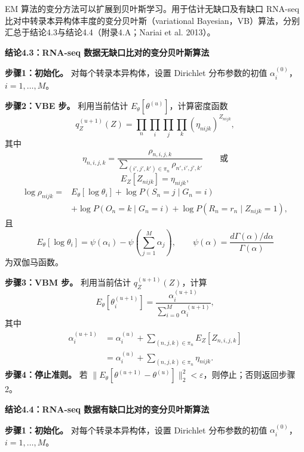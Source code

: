 EM 算法的变分方法可以扩展到贝叶斯学习。用于估计无缺口及有缺口 RNA-seq 比对中转录本异构体丰度的变分贝叶斯（variational Bayesian，VB）算法，分别汇总于结论4.3与结论4.4（附录4.A；Nariai et al. 2013）。

\par\medskip{}
\noindent\textbf{结论4.3：RNA-seq 数据无缺口比对的变分贝叶斯算法}\par
\noindent\textbf{步骤1：初始化。}
对每个转录本异构体，设置 Dirichlet 分布参数的初值 $\alpha_i^{(0)}$，$i=1,\ldots,M$。

\noindent\textbf{步骤2：VBE 步。}
利用当前估计 $E_{\theta}[\theta^{(u)}]$，计算密度函数
\begin{equation}
q_Z^{(u+1)}(Z)=\prod_n\prod_i\prod_j\prod_k(\eta_{nijk})^{Z_{nijk}},
\tag{4.34}
\end{equation}
其中
\begin{equation}
\eta_{n,i,j,k}=\frac{\rho_{n,i,j,k}}
{\sum_{(i',j',k')\in\pi_n}\rho_{n',i',j',k'}}\qquad\text{或}
\tag{4.35}
\end{equation}
\[
E_Z[Z_{nijk}]=\eta_{nijk},
\]
\[
\begin{aligned}
\log\rho_{nijk}
={}&E_{\theta}[\log\theta_i]+\log P(S_n=j\mid G_n=i)\\
&+\log P(O_n=k\mid G_n=i)+\log P(R_n=r_n\mid Z_{nijk}=1),
\end{aligned}
\]
且
\[
E_{\theta}[\log\theta_i]=\psi(\alpha_i)-\psi\left(\sum_{j=1}^{M}\alpha_j\right),
\qquad
\psi(\alpha)=\frac{d\Gamma(\alpha)/d\alpha}{\Gamma(\alpha)}
\]
为双伽马函数。

\noindent\textbf{步骤3：VBM 步。}
利用当前估计 $q_Z^{(u+1)}(Z)$，计算
\begin{equation}
E_{\theta}[\theta_i^{(u+1)}]=\frac{\alpha_i^{(u+1)}}{\sum_{i=0}^{M}\alpha_i^{(u+1)}},
\tag{4.36}
\end{equation}
其中
\begin{equation}
\begin{aligned}
\alpha_i^{(u+1)}&=\alpha_i^{(u)}+\sum_{(n,j,k)\in\pi_n}E_Z[Z_{n,i,j,k}]\\
&=\alpha_i^{(u)}+\sum_{(n,j,k)\in\pi_n}\eta_{nijk}.
\end{aligned}
\tag{4.37}
\end{equation}
\noindent\textbf{步骤4：停止准则。}
若 $\lVert E_{\theta}[\theta^{(u+1)}-\theta^{(u)}]\rVert_2^2<\varepsilon$，则停止；否则返回步骤2。

\par\medskip{}
\noindent\textbf{结论4.4：RNA-seq 数据有缺口比对的变分贝叶斯算法}\par
\noindent\textbf{步骤1：初始化。}
对每个转录本异构体，设置 Dirichlet 分布参数的初值 $\alpha_i^{(0)}$，$i=1,\ldots,M$。

